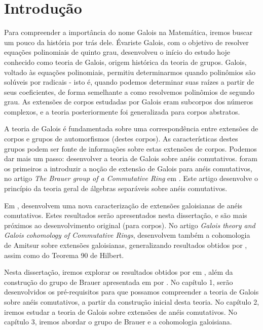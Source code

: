 \documentclass[12pt]{report}
\theoremstyle{definition}
\theoremstyle{remark}
\begin{document}
\chapter*{Introdução}  
Para compreender a importância do nome Galois na Matemática, iremos buscar um pouco da história por trás dele. Évariste Galois, com o objetivo de resolver equações polinomiais de quinto grau, desenvolveu o início do estudo hoje conhecido como teoria de Galois, origem histórica da teoria de grupos. Galois, voltado às equações polinomiais, permitiu determinarmos quando polinômios são solúveis por radicais - isto é, quando podemos determinar suas raízes a partir de seus coeficientes, de forma semelhante a como resolvemos polinômios de segundo grau. As extensões de corpos estudadas por Galois eram subcorpos dos números complexos, e a teoria posteriormente foi generalizada para corpos abstratos. \par
A teoria de Galois é fundamentada sobre uma correspondência entre extensões de corpos e grupos de automorfismos (destes corpos). As características destes grupos podem ser fonte de informações sobre estas extensões de corpos. Podemos dar mais um passo: desenvolver a teoria de Galois sobre anéis comutativos. \citeauthor{brauer} foram os primeiros a introduzir a noção de extensão de Galois para anéis comutativos, no artigo \emph{The Brauer group of a Commutative Ring} em \citeyear{brauer}. Este artigo desenvolve o princípio da teoria geral de álgebras separáveis sobre anéis comutativos. \par
Em \citeyear{chr}, \citeauthor*{chr} desenvolvem uma nova caracterização de extensões galoisianas de anéis comutativos. Estes resultados serão apresentados nesta dissertação, e são mais próximos ao desenvolvimento original (para corpos). No artigo \emph{Galois theory and Galois cohomology of Commutative Rings}, \citeauthor*{chr} desenvolvem também a cohomologia de Amitsur sobre extensões galoisianas, generalizando resultados obtidos por \citeauthor*{brauer}, assim como do Teorema 90 de Hilbert. \par 
Nesta dissertação, iremos explorar os resultados obtidos por \citeauthor*{chr} em \cite{chr}, além da construção do grupo de Brauer apresentada em \cite{brauer} por \citeauthor{brauer}. No capítulo 1, serão desenvolvidos os pré-requisitos para que possamos compreender a teoria de Galois sobre anéis comutativos, a partir da construção inicial desta teoria. No capítulo 2, iremos estudar a teoria de Galois sobre extensões de anéis comutativos. No capítulo 3, iremos abordar o grupo de Brauer e a cohomologia galoisiana.




\end{document}
